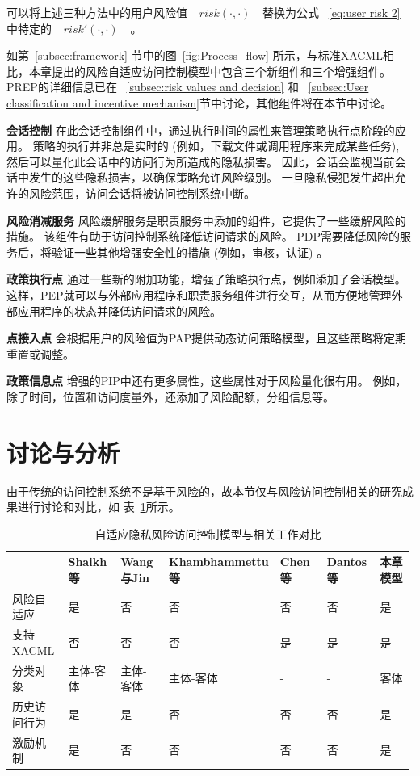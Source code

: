 可以将上述三种方法中的用户风险值 ~$~risk(\cdot,\cdot)~$~ 替换为公式 ~\ref{eq:user risk 2} 中特定的 ~$~risk'(\cdot,\cdot)~$~ 。


如第~\ref{subsec:framework} 节中的图~\ref{fig:Process_flow} 所示，与标准XACML相比，本章提出的风险自适应访问控制模型中包含三个新组件和三个增强组件。PREP的详细信息已在 ~\ref{subsec:risk values and decision} 和 ~\ref{subsec:User classification and incentive mechanism}节中讨论，其他组件将在本节中讨论。

\textbf{会话控制} 在此会话控制组件中，通过执行时间的属性来管理策略执行点阶段的应用。 策略的执行并非总是实时的 (例如，下载文件或调用程序来完成某些任务), 然后可以量化此会话中的访问行为所造成的隐私损害。 因此，会话会监视当前会话中发生的这些隐私损害，以确保策略允许风险级别。 一旦隐私侵犯发生超出允许的风险范围，访问会话将被访问控制系统中断。

\textbf{风险消减服务} 风险缓解服务是职责服务中添加的组件，它提供了一些缓解风险的措施。 该组件有助于访问控制系统降低访问请求的风险。 PDP需要降低风险的服务后，将验证一些其他增强安全性的措施 (例如，审核，认证) 。

\textbf{政策执行点} 通过一些新的附加功能，增强了策略执行点，例如添加了会话模型。 这样，PEP就可以与外部应用程序和职责服务组件进行交互，从而方便地管理外部应用程序的状态并降低访问请求的风险。

\textbf{点接入点} 会根据用户的风险值为PAP提供动态访问策略模型，且这些策略将定期重置或调整。

\textbf{政策信息点} 增强的PIP中还有更多属性，这些属性对于风险量化很有用。 例如，除了时间，位置和访问度量外，还添加了风险配额，分组信息等。

\section{讨论与分析}
\label{sec:Discussion and analysis}
由于传统的访问控制系统不是基于风险的，故本节仅与风险访问控制相关的研究成果进行讨论和对比，如 表~\ref{tab:rabac-comparison}所示。

\begin{table}[htbp]
	\caption{自适应隐私风险访问控制模型与相关工作对比}
	\label{tab:rabac-comparison}
	\centering
	\small
	\begin{tabular}{p{0.15\linewidth}p{0.14\linewidth}p{0.14\linewidth}p{0.14\linewidth}p{0.14\linewidth}p{0.14\linewidth}p{0.14\linewidth}}
		\toprule
		 & Shaikh等~\cite{shaikh2012dynamic} & Wang与Jin~\cite{wang2011quantified}& Khambhammettu等~\cite{khambhammettu2013framework}& Chen等~\cite{Chen2014}& Dantos等~\cite{santos2014dynamic}& 本章模型\\
		\midrule
		风险自适应 & 是 &否  &否 &否 &否 &是\\
		支持XACML & 否 &否  &否 &是 &是 &是\\
		分类对象  &主体-客体 &主体-客体 &主体-客体 &- &- &客体\\
		历史访问行为 & 是 &是  &否 &否 &否 &是\\
		激励机制& 是 &否  &否 &否 &否 &是\\
		\bottomrule
	\end{tabular}
\end{table}

